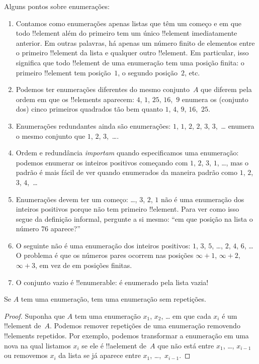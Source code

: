 \documentclass[../../../include/open-logic-section]{subfiles}
\begin{document}
\begin{explain}
Alguns pontos sobre enumerações:
\begin{enumerate}
\item Contamos como enumerações apenas listas que têm um começo e
  em que todo !!{element} além do primeiro tem um único
  !!{element} imediatamente anterior. Em outras palavras, há
  apenas um número finito de elementos entre o primeiro !!{element} da
  lista e qualquer outro !!{element}. Em particular, isso significa que todo
  !!{element} de uma enumeração tem uma posição finita: o primeiro
  !!{element} tem posição~$1$, o segundo posição~$2$, etc.
\item Podemos ter enumerações diferentes do mesmo conjunto~$A$ que
  diferem pela ordem em que os !!{element}s aparecem: $4$, $1$,
  $25$, $16$,~$9$ enumera os (conjunto dos) cinco primeiros quadrados
  tão bem quanto $1$, $4$, $9$, $16$,~$25$.
\item Enumerações redundantes ainda são enumerações: $1$, $1$, $2$,
  $2$, $3$, $3$,~\dots{} enumera o mesmo conjunto que $1$, $2$,
  $3$,~\dots{}.
\item Ordem e redundância \emph{importam} quando especificamos uma
  enumeração: podemos enumerar os inteiros positivos começando com
  $1$, $2$, $3$, $1$, \dots{}, mas o padrão é mais fácil de ver quando
  enumerados da maneira padrão como $1$, $2$, $3$, $4$,~\dots
\item Enumerações devem ter um começo: \dots, $3$, $2$, $1$ não é
  uma enumeração dos inteiros positivos porque não tem primeiro
  !!{element}. Para ver como isso segue da definição informal,
  pergunte a si mesmo: ``em que posição na lista o número 76
  aparece?''
\item O seguinte não é uma enumeração dos inteiros positivos:
  $1$, $3$, $5$, \dots, $2$, $4$, $6$, \dots\@ O problema é que os
  números pares ocorrem nas posições $\infty + 1$, $\infty + 2$, $\infty +
  3$, em vez de em posições finitas.
\item O conjunto vazio é !!{enumerable}: é enumerado pela lista vazia!{}
\end{enumerate}
\end{explain}

\begin{prop}
  Se $A$ tem uma enumeração, tem uma enumeração sem
  repetições.
\end{prop}

\begin{proof}
  Suponha que $A$ tem uma enumeração $x_1$, $x_2$, \dots{} em que cada
  $x_i$ é um !!{element} de~$A$. Podemos remover repetições de uma
  enumeração removendo !!{element}s repetidos. Por exemplo, podemos
  transformar a enumeração em uma nova na qual listamos $x_i$ se
  ele é !!a{element} de~$A$ que não está entre $x_1$, \dots,
  $x_{i-1}$ ou removemos $x_i$ da lista se já aparece entre
  $x_1$, \dots,~$x_{i-1}$.
\end{proof}
\end{document}

